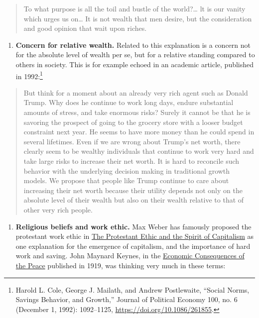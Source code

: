 \documentclass[]{book}
\providecommand{\tightlist}{%
  \setlength{\itemsep}{0pt}\setlength{\parskip}{0pt}}
\let\rmarkdownfootnote\footnote%
\def\footnote{\protect\rmarkdownfootnote}
\theoremstyle{definition}
\theoremstyle{definition}
\theoremstyle{definition}
\theoremstyle{remark}
\begin{document}
\begin{quote}
To what purpose is all the toil and bustle of the world?\ldots{} lt is
our vanity which urges us on\ldots{} It is not wealth that men desire,
but the consideration and good opinion that wait upon riches.
\end{quote}

\begin{enumerate}
\def\labelenumi{\arabic{enumi}.}
\setcounter{enumi}{2}
\tightlist
\item
  \textbf{Concern for relative wealth.} Related to this explanation is a
  concern not for the absolute level of wealth per se, but for a
  relative standing compared to others in society. This is for example
  echoed in an academic article, published in 1992:\footnote{Harold L.
    Cole, George J. Mailath, and Andrew Postlewaite, ``Social Norms,
    Savings Behavior, and Growth,'' Journal of Political Economy 100,
    no. 6 (December 1, 1992): 1092--1125,
    \url{https://doi.org/10.1086/261855}.}
\end{enumerate}

\begin{quote}
But think for a moment about an already very rich agent such as Donald
Trump. Why does he continue to work long days, endure substantial
amounts of stress, and take enormous risks? Surely it cannot be that he
is savoring the prospect of going to the grocery store with a looser
budget constraint next year. He seems to have more money than he could
spend in several lifetimes. Even if we are wrong about Trump's net
worth, there clearly seem to be wealthy individuals that continue to
work very hard and take large risks to increase their net worth. It is
hard to reconcile such behavior with the underlying decision making in
traditional growth models. We propose that people like Trump continue to
care about increasing their net worth because their utility depends not
only on the absolute level of their wealth but also on their wealth
relative to that of other very rich people.
\end{quote}

\begin{enumerate}
\def\labelenumi{\arabic{enumi}.}
\setcounter{enumi}{3}
\tightlist
\item
  \textbf{Religious beliefs and work ethic.} Max Weber has famously
  proposed the protestant work ethic in
  \href{https://en.wikipedia.org/wiki/The_Protestant_Ethic_and_the_Spirit_of_Capitalism}{The
  Protestant Ethic and the Spirit of Capitalism} as one explanation for
  the emergence of capitalism, and the importance of hard work and
  saving. John Maynard Keynes, in the
  \href{https://socialsciences.mcmaster.ca/econ/ugcm/3ll3/keynes/pdf\%26filename\%3Dpeace3.pdf}{Economic
  Consequences of the Peace} published in 1919, was thinking very much
  in these terms:
\end{enumerate}
\end{document}
